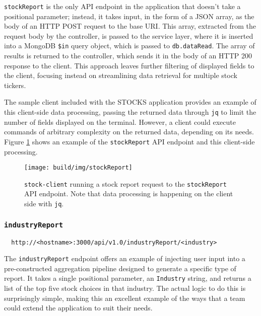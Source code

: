 \documentclass[
11pt,
titlepage,
]{article}
\begin{document}
\texttt{stockReport} is the only API endpoint in the application that doesn't
take a positional parameter; instead, it takes input, in the form of a JSON
array, as the body of an HTTP POST request to the base URI. This array,
extracted from the request body by the controller, is passed to the service
layer, where it is inserted into a MongoDB \texttt{\$in} query object, which is
passed to \texttt{db.dataRead}. The array of results is returned to the
controller, which sends it in the body of an HTTP 200 response to the client.
This approach leaves further filtering of displayed fields to the client,
focusing instead on streamlining data retrieval for multiple stock tickers.

The sample client included with the STOCKS application provides an example of
this client-side data processing, passing the returned data through \texttt{jq}
to limit the number of fields displayed on the terminal. However, a client could
execute commands of arbitrary complexity on the returned data, depending on its
needs. Figure \ref{fig:stockReport} shows an example of the \texttt{stockReport}
API endpoint and this client-side processing.

\begin{figure}[tp]
  \texttt{[image: build/img/stockReport]}
  \caption{\texttt{stock-client} running a stock report request to the
    \texttt{stockReport} API endpoint. Note that data processing is happening on
    the client side with \texttt{jq}.}
  \label{fig:stockReport}
\end{figure}

\subsubsection{\texttt{industryReport}}

\begin{lstlisting}
  http://<hostname>:3000/api/v1.0/industryReport/<industry>
\end{lstlisting}

The \texttt{industryReport} endpoint offers an example of injecting user input
into a pre-constructed aggregation pipeline designed to generate a specific type
of report. It takes a single positional parameter, an \texttt{Industry} string,
and returns a list of the top five stock choices in that industry. The actual
logic to do this is surprisingly simple, making this an excellent example of the
ways that a team could extend the application to suit their needs.
\end{document}
